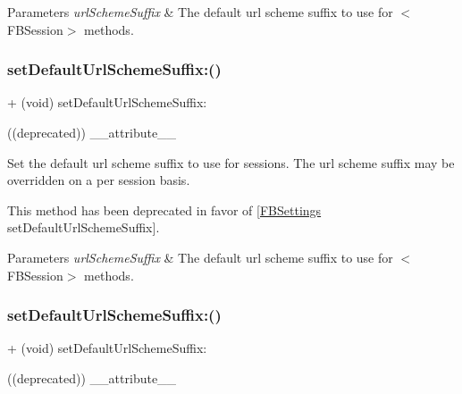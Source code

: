 \begin{DoxyParams}{Parameters}
{\em url\+Scheme\+Suffix} & The default url scheme suffix to use for $<$\+F\+B\+Session$>$ methods. \\
\hline
\end{DoxyParams}
\mbox{\label{interfaceFBSession_ac3d4f0df3cae8fe5091b9d98b9f166d4}} 
\subsubsection{\texorpdfstring{set\+Default\+Url\+Scheme\+Suffix\+:()}{setDefaultUrlSchemeSuffix:()}\hspace{0.1cm}{\footnotesize\ttfamily [3/5]}}
{\footnotesize\ttfamily + (void) set\+Default\+Url\+Scheme\+Suffix\+: \begin{DoxyParamCaption}\item[{((deprecated))}]{\+\_\+\+\_\+attribute\+\_\+\+\_\+ }\end{DoxyParamCaption}}

Set the default url scheme suffix to use for sessions. The url scheme suffix may be overridden on a per session basis.

This method has been deprecated in favor of \mbox{[}\hyperlink{interfaceFBSettings}{F\+B\+Settings} set\+Default\+Url\+Scheme\+Suffix\mbox{]}.


\begin{DoxyParams}{Parameters}
{\em url\+Scheme\+Suffix} & The default url scheme suffix to use for $<$\+F\+B\+Session$>$ methods. \\
\hline
\end{DoxyParams}
\mbox{\label{interfaceFBSession_ac3d4f0df3cae8fe5091b9d98b9f166d4}} 
\subsubsection{\texorpdfstring{set\+Default\+Url\+Scheme\+Suffix\+:()}{setDefaultUrlSchemeSuffix:()}\hspace{0.1cm}{\footnotesize\ttfamily [4/5]}}
{\footnotesize\ttfamily + (void) set\+Default\+Url\+Scheme\+Suffix\+: \begin{DoxyParamCaption}\item[{((deprecated))}]{\+\_\+\+\_\+attribute\+\_\+\+\_\+ }\end{DoxyParamCaption}}

